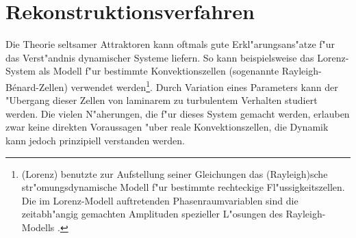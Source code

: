\section{Rekonstruktionsverfahren}

Die Theorie seltsamer Attraktoren kann oftmals gute Erkl"arungsans"atze f"ur das
Ver\-st"andnis dynamischer Systeme liefern. So kann beispielsweise das Lorenz-System als
Modell f"ur bestimmte Konvektionszellen (sogenannte Rayleigh-B\'enard-Zellen) verwendet
werden\footnote{\autor(Lorenz) benutzte zur Aufstellung seiner Gleichungen das
  \autor(Rayleigh)sche str"omungsdynamische Modell f"ur bestimmte rechteckige
  Fl"ussigkeitszellen. Die im Lorenz-Modell auftretenden Phasenraumvariablen sind die
  zeitabh"angig gemachten Amplituden spezieller L"osungen des Rayleigh-Modells
  \cite{Peitgen92}.}. Durch Variation eines Parameters kann der 
"Ubergang dieser Zellen von laminarem zu turbulentem Verhalten studiert werden. Die vielen
N"aherungen, die f"ur dieses System gemacht werden, erlauben zwar keine direkten
Voraussagen "uber reale Konvektionszellen, die Dynamik kann jedoch prinzipiell verstanden
werden.

